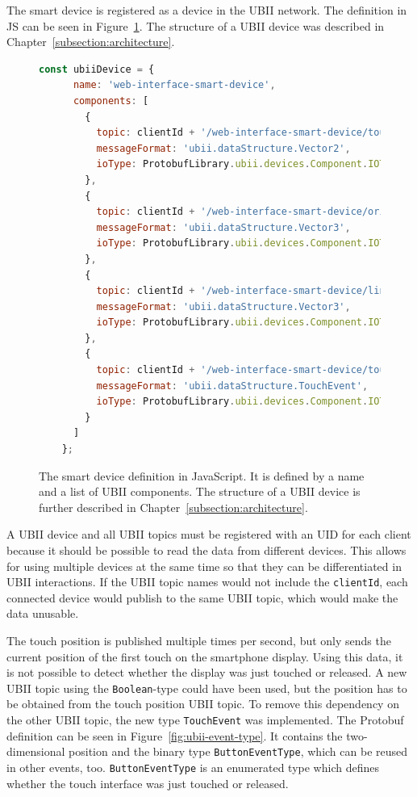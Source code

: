 The smart device is registered as a device in the \ac{UBII} network. The definition in \ac{JS} can be seen in Figure~\ref{fig:ubii-device-registration}. The structure of a \ac{UBII} device was described in Chapter~\ref{subsection:architecture}. 

\begin{figure}[H]
  \begin{lstlisting}[language=JavaScript]
    const ubiiDevice = {
      name: 'web-interface-smart-device',
      components: [
        {
          topic: clientId + '/web-interface-smart-device/touch_position',
          messageFormat: 'ubii.dataStructure.Vector2',
          ioType: ProtobufLibrary.ubii.devices.Component.IOType.INPUT
        },
        {
          topic: clientId + '/web-interface-smart-device/orientation',
          messageFormat: 'ubii.dataStructure.Vector3',
          ioType: ProtobufLibrary.ubii.devices.Component.IOType.INPUT
        },
        {
          topic: clientId + '/web-interface-smart-device/linear_acceleration',
          messageFormat: 'ubii.dataStructure.Vector3',
          ioType: ProtobufLibrary.ubii.devices.Component.IOType.INPUT
        },
        {
          topic: clientId + '/web-interface-smart-device/touch_events',
          messageFormat: 'ubii.dataStructure.TouchEvent',
          ioType: ProtobufLibrary.ubii.devices.Component.IOType.INPUT
        }
      ]
    };
  \end{lstlisting}
  \caption[Protobuf definition of the smart device]{The smart device definition in JavaScript. It is defined by a name and a list of \ac{UBII} components. The structure of a \ac{UBII} device is further described in Chapter~\ref{subsection:architecture}.}\label{fig:ubii-device-registration}
\end{figure}

A \ac{UBII} device and all \ac{UBII} topics must be registered with an \ac{UID} for each client because it should be possible to read the data from different devices. This allows for using multiple devices at the same time so that they can be differentiated in \ac{UBII} interactions. If the \ac{UBII} topic names would not include the \lstinline{clientId}, each connected device would publish to the same \ac{UBII} topic, which would make the data unusable.

The touch position is published multiple times per second, but only sends the current position of the first touch on the smartphone display. Using this data, it is not possible to detect whether the display was just touched or released. A new \ac{UBII} topic using the \lstinline{Boolean}-type could have been used, but the position has to be obtained from the touch position \ac{UBII} topic. To remove this dependency on the other \ac{UBII} topic, the new type \lstinline{TouchEvent} was implemented. The \ac{Protobuf} definition can be seen in Figure~\ref{fig:ubii-event-type}. It contains the two-dimensional position and the binary type \mbox{\lstinline{ButtonEventType},} which can be reused in other events, too. \lstinline{ButtonEventType} is an enumerated type which defines whether the touch interface was just touched or released.

